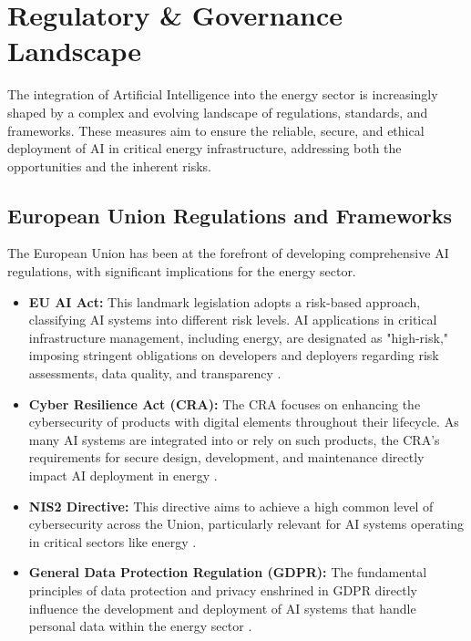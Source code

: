 \section{Regulatory \& Governance Landscape}

The integration of Artificial Intelligence into the energy sector is increasingly shaped by a complex and evolving landscape of regulations, standards, and frameworks. These measures aim to ensure the reliable, secure, and ethical deployment of AI in critical energy infrastructure, addressing both the opportunities and the inherent risks.

\subsection{European Union Regulations and Frameworks}
The European Union has been at the forefront of developing comprehensive AI regulations, with significant implications for the energy sector.
\begin{itemize}
    \item \textbf{EU AI Act:} This landmark legislation adopts a risk-based approach, classifying AI systems into different risk levels. AI applications in critical infrastructure management, including energy, are designated as "high-risk," imposing stringent obligations on developers and deployers regarding risk assessments, data quality, and transparency \cite{MDPI_EU_AI_Act, PinsentMasons_EU_AI_Act}.
    \item \textbf{Cyber Resilience Act (CRA):} The CRA focuses on enhancing the cybersecurity of products with digital elements throughout their lifecycle. As many AI systems are integrated into or rely on such products, the CRA's requirements for secure design, development, and maintenance directly impact AI deployment in energy \cite{EU_CRA_Website, PillsburyLaw_CRA}.
    \item \textbf{NIS2 Directive:} This directive aims to achieve a high common level of cybersecurity across the Union, particularly relevant for AI systems operating in critical sectors like energy \cite{BSIGroup_EU_AI}.
    \item \textbf{General Data Protection Regulation (GDPR):} The fundamental principles of data protection and privacy enshrined in GDPR directly influence the development and deployment of AI systems that handle personal data within the energy sector \cite{MDPI_EU_AI_Act, Capco_EU_AI}.
\end{itemize}

